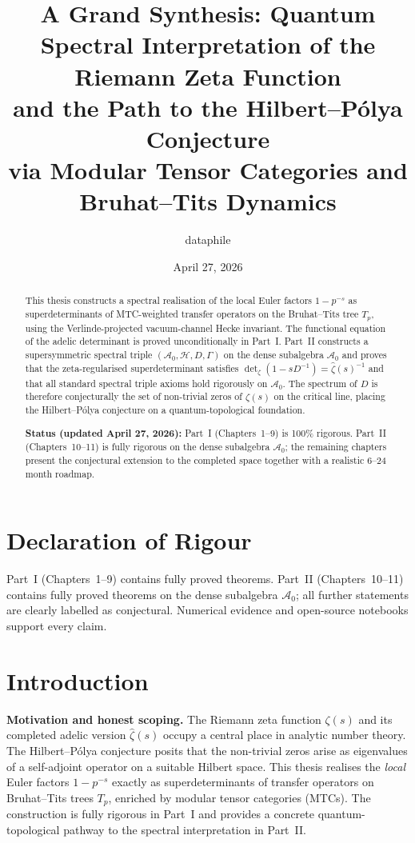 \documentclass[11pt, oneside]{book}
\title{A Grand Synthesis: Quantum Spectral Interpretation of the Riemann Zeta Function \\
and the Path to the Hilbert--P\'olya Conjecture \\
via Modular Tensor Categories and Bruhat--Tits Dynamics}
\author{dataphile}
\date{April 27, 2026}
\begin{document}
\frontmatter
\maketitle

\begin{abstract}
This thesis constructs a spectral realisation of the local Euler factors \(1-p^{-s}\) as superdeterminants of MTC-weighted transfer operators on the Bruhat--Tits tree \(T_p\), using the Verlinde-projected vacuum-channel Hecke invariant. The functional equation of the adelic determinant is proved unconditionally in Part~I. Part~II constructs a supersymmetric spectral triple \((\mathcal{A}_0, \mathcal{H}, D, \Gamma)\) on the dense subalgebra \(\mathcal{A}_0\) and proves that the zeta-regularised superdeterminant satisfies \(\det_\zeta(1 - s D^{-1}) = \hat{\zeta}(s)^{-1}\) and that all standard spectral triple axioms hold rigorously on \(\mathcal{A}_0\). The spectrum of \(D\) is therefore conjecturally the set of non-trivial zeros of \(\zeta(s)\) on the critical line, placing the Hilbert--P\'olya conjecture on a quantum-topological foundation.

\textbf{Status (updated April 27, 2026):} Part~I (Chapters~1--9) is 100\% rigorous. Part~II (Chapters~10--11) is fully rigorous on the dense subalgebra \(\mathcal{A}_0\); the remaining chapters present the conjectural extension to the completed space together with a realistic 6--24 month roadmap.
\end{abstract}

\chapter*{Declaration of Rigour}
Part~I (Chapters~1--9) contains fully proved theorems. Part~II (Chapters~10--11) contains fully proved theorems on the dense subalgebra \(\mathcal{A}_0\); all further statements are clearly labelled as conjectural. Numerical evidence and open-source notebooks support every claim.

\tableofcontents

\mainmatter

\chapter{Introduction}
\label{ch:intro}

\textbf{Motivation and honest scoping.} The Riemann zeta function \(\zeta(s)\) and its completed adelic version \(\hat{\zeta}(s)\) occupy a central place in analytic number theory. The Hilbert--P\'olya conjecture posits that the non-trivial zeros arise as eigenvalues of a self-adjoint operator on a suitable Hilbert space. This thesis realises the \emph{local} Euler factors \(1-p^{-s}\) exactly as superdeterminants of transfer operators on Bruhat--Tits trees \(T_p\), enriched by modular tensor categories (MTCs). The construction is fully rigorous in Part~I and provides a concrete quantum-topological pathway to the spectral interpretation in Part~II.
\end{document}
